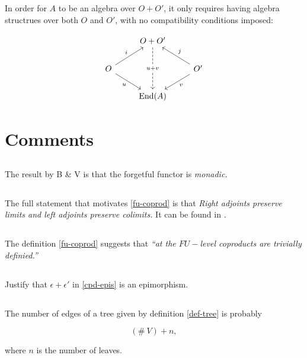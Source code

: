 \documentclass{amsart}
\begin{document}
In order for $A$ to be an algebra over $O + O'$, it only requires having
algebra structrues over both $O$ and $O'$, with no compatibility conditions
imposed:

\begin{equation}\label{opd-cpd}
		\begin{tikzcd}
			& O + O' \arrow[dd, dashed, "u + v" description] &
					\\
			O \arrow[rd, "u"'] \arrow[ru, "i"] & & O'
				\arrow[ld, "v"] \arrow[lu, "j"'] \\
			& \mathrm{End}(A) &
		\end{tikzcd}
\end{equation}

\section{Comments}

\subsection{} The result by B \& V is that the forgetful functor is
\emph{monadic.}

\subsection{} The full statement that motivates \eqref{fu-coprod} is that
\emph{Right adjoints preserve limits and left adjoints preserve colimits.}
It can be found in \cite{riehl-ctic}.

\subsection{} The definition \eqref{fu-coprod} suggests that
\emph{``at the $FU-$level coproducts are trivially definied.''}

\subsection{} Justify that $\epsilon + \epsilon'$ in \eqref{cpd-epis} is
an epimorphism.

\subsection{} The number of edges of a tree given by definition
\ref{def-tree} is probably

$$
(\# \ V) + n,
$$

where $n$ is the number of leaves.
\end{document}

